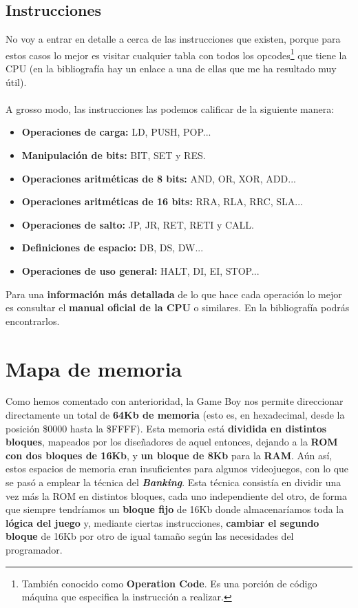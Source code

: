 \subsection{Instrucciones}

No voy a entrar en detalle a cerca de las instrucciones que existen, porque para estos casos lo mejor es visitar cualquier tabla con todos los opcodes\footnote{También conocido como \textbf{Operation Code}. Es una porción de código máquina que especifica la instrucción a realizar.} que tiene la CPU (en la bibliografía hay un enlace a una de ellas que me ha resultado muy útil).
\\ \\ 
A grosso modo, las instrucciones las podemos calificar de la siguiente manera:

\begin{itemize}
	\item \textbf{Operaciones de carga:} LD, PUSH, POP...
    \item \textbf{Manipulación de bits:} BIT, SET y RES.
    \item \textbf{Operaciones aritméticas de 8 bits:} AND, OR, XOR, ADD...
    \item \textbf{Operaciones aritméticas de 16 bits:} RRA, RLA, RRC, SLA...
    \item \textbf{Operaciones de salto:} JP, JR, RET, RETI y CALL.
    \item \textbf{Definiciones de espacio:} DB, DS, DW...
    \item \textbf{Operaciones de uso general:} HALT, DI, EI, STOP...
\end{itemize}

Para una \textbf{información más detallada} de lo que hace cada operación lo mejor es consultar el \textbf{manual oficial de la CPU} o similares. En la bibliografía podrás encontrarlos.

\clearpage

\section{Mapa de memoria}
\label{memory_map}

Como hemos comentado con anterioridad, la Game Boy nos permite direccionar directamente un total de \textbf{64Kb de memoria} (esto es, en hexadecimal, desde la posición \$0000 hasta la \$FFFF). Esta memoria está \textbf{dividida en distintos bloques}, mapeados por los diseñadores de aquel entonces, dejando a la \textbf{ROM con dos bloques de 16Kb}, y \textbf{un bloque de 8Kb} para la \textbf{RAM}. Aún así, estos espacios de memoria eran insuficientes para algunos videojuegos, con lo que se pasó a emplear la técnica del \textbf{\textit{Banking}}. Esta técnica consistía en dividir una vez más la ROM en distintos bloques, cada uno independiente del otro, de forma que siempre tendríamos un \textbf{bloque fijo} de 16Kb donde almacenaríamos toda la \textbf{lógica del juego} y, mediante ciertas instrucciones, \textbf{cambiar el segundo bloque} de 16Kb por otro de igual tamaño según las necesidades del programador.

